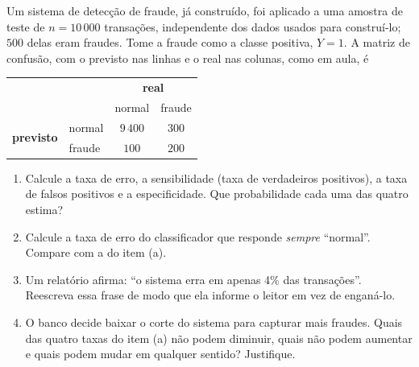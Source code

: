 \documentclass[11pt,a4paper]{article}
\begin{document}

\begin{exercicio}
Um sistema de detecção de fraude, já construído, foi aplicado a uma amostra de teste
de $n=10\,000$ transações, independente dos dados usados para construí-lo; $500$
delas eram fraudes. Tome a fraude como a classe positiva, $Y=1$. A matriz de
confusão, com o previsto nas linhas e o real nas colunas, como em aula, é
\begin{center}\small
\renewcommand{\arraystretch}{1.3}
\begin{tabular}{@{}ll cc@{}}
\toprule
 & & \multicolumn{2}{c}{\textbf{real}} \\
 & & normal & fraude \\
\midrule
\multirow{2}{*}{\textbf{previsto}} & normal & $9\,400$ & $300$ \\
                                   & fraude & $100$    & $200$ \\
\bottomrule
\end{tabular}
\end{center}
\begin{enumerate}[label=(\alph*),leftmargin=1.1cm]
  \item Calcule a taxa de erro, a sensibilidade (taxa de verdadeiros positivos), a
        taxa de falsos positivos e a especificidade. Que probabilidade cada uma das
        quatro estima?
  \item Calcule a taxa de erro do classificador que responde \emph{sempre}
        ``normal''. Compare com a do item (a).
  \item Um relatório afirma: ``o sistema erra em apenas 4\% das transações''.
        Reescreva essa frase de modo que ela informe o leitor em vez de enganá-lo.
  \item O banco decide baixar o corte do sistema para capturar mais fraudes. Quais
        das quatro taxas do item (a) não podem diminuir, quais não podem aumentar e
        quais podem mudar em qualquer sentido? Justifique.
\end{enumerate}
\end{exercicio}
\end{document}
